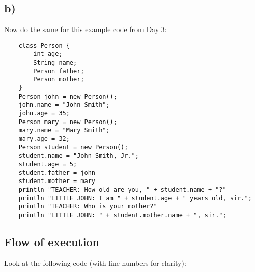 \documentclass{article}
\begin{document}
\subsection{b)}
\label{sec:bff}

Now do the same for this example code from Day 3:

\begin{verbatim}
    class Person {
        int age;
        String name;
        Person father;
        Person mother;
    }
    Person john = new Person();
    john.name = "John Smith";
    john.age = 35;
    Person mary = new Person();
    mary.name = "Mary Smith";
    mary.age = 32;
    Person student = new Person();
    student.name = "John Smith, Jr.";
    student.age = 5;
    student.father = john
    student.mother = mary
    println "TEACHER: How old are you, " + student.name + "?"
    println "LITTLE JOHN: I am " + student.age + " years old, sir.";
    println "TEACHER: Who is your mother?"
    println "LITTLE JOHN: " + student.mother.name + ", sir.";
\end{verbatim}

\subsection{Flow of execution}
\label{sec:flow-execution}

Look at the following code (with line numbers for clarity): 
\end{document}
